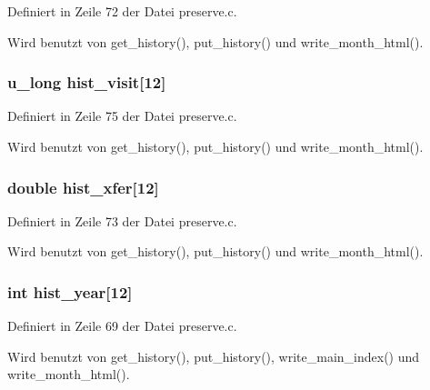 Definiert in Zeile 72 der Datei preserve.c.

Wird benutzt von get\_\-history(), put\_\-history() und write\_\-month\_\-html().
\subsubsection{\setlength{\rightskip}{0pt plus 5cm}u\_\-long {\bf hist\_\-visit}[12]}\label{preserve_8c_686df2d8a29e5dc08eddd9679fecc5ff}




Definiert in Zeile 75 der Datei preserve.c.

Wird benutzt von get\_\-history(), put\_\-history() und write\_\-month\_\-html().
\subsubsection{\setlength{\rightskip}{0pt plus 5cm}double {\bf hist\_\-xfer}[12]}\label{preserve_8c_9258e499d6896ed681dbe7582d7047c4}




Definiert in Zeile 73 der Datei preserve.c.

Wird benutzt von get\_\-history(), put\_\-history() und write\_\-month\_\-html().
\subsubsection{\setlength{\rightskip}{0pt plus 5cm}int {\bf hist\_\-year}[12]}\label{preserve_8c_bd6905416f4fb7c9cc62053f1f952d32}




Definiert in Zeile 69 der Datei preserve.c.

Wird benutzt von get\_\-history(), put\_\-history(), write\_\-main\_\-index() und write\_\-month\_\-html().